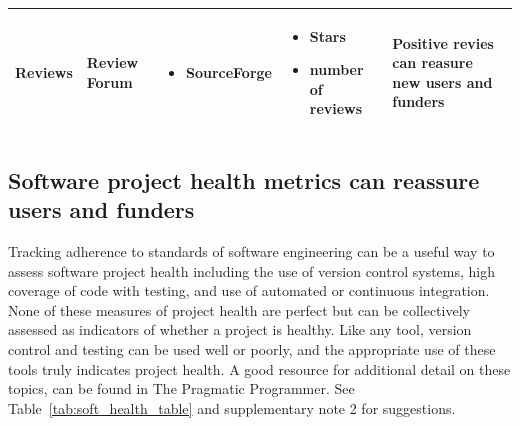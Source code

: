 \documentclass{article}
\begin{document}
\begin{table}
\begin{tabular} {|p{}|p{}|p{}|p{}|p{}|}
    \hline
       \multirow{3}{*}{Reviews}
    & Review Forum & 
    \begin{itemize}
        \item SourceForge
    \end{itemize} &  \begin{itemize}
        \item Stars
        \item number of reviews
    \end{itemize} & Positive revies can reasure new users and funders\\ 
    \hline
  \end{tabular}
  \label{tab:inf_table}
\end{table}



\subsection{Software project health metrics can reassure users and funders}
Tracking adherence to standards of software engineering can be a useful way to assess software project health including the use of version control systems, high coverage of code with testing, and use of automated or continuous integration. None of these measures of project health are perfect but can be collectively assessed as indicators of whether a project is healthy. Like any tool, version control and testing can be used well or poorly, and the appropriate use of these tools truly indicates project health. A good resource for additional detail on these topics, can be found in The Pragmatic Programmer\cite{thomas_pragmatic_2019}. See Table~\ref{tab:soft_health_table} and supplementary note 2 for suggestions.
\end{document}
